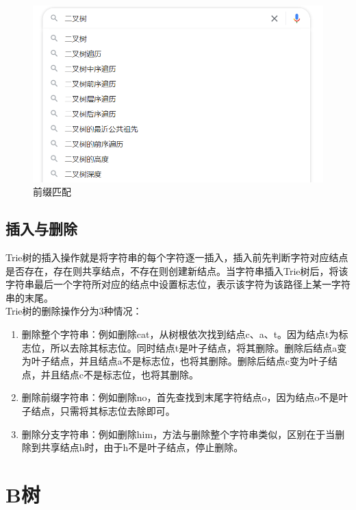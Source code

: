 \begin{figure}[H]
	\centering
	\includegraphics[scale=0.8]{img/C17/17-4/1.png}
	\caption{前缀匹配}
\end{figure}

\vspace{0.5cm}

\subsection{插入与删除}

Trie树的插入操作就是将字符串的每个字符逐一插入，插入前先判断字符对应结点是否存在，存在则共享结点，不存在则创建新结点。当字符串插入Trie树后，将该字符串最后一个字符所对应的结点中设置标志位，表示该字符为该路径上某一字符串的末尾。\\

Trie树的删除操作分为3种情况：

\begin{enumerate}
	\item 删除整个字符串：例如删除cat，从树根依次找到结点c、a、t。因为结点t为标志位，所以去除其标志位。同时结点t是叶子结点，将其删除。删除后结点a变为叶子结点，并且结点a不是标志位，也将其删除。删除后结点c变为叶子结点，并且结点c不是标志位，也将其删除。

	\item 删除前缀字符串：例如删除no，首先查找到末尾字符结点o，因为结点o不是叶子结点，只需将其标志位去除即可。

	\item 删除分支字符串：例如删除him，方法与删除整个字符串类似，区别在于当删除到共享结点h时，由于h不是叶子结点，停止删除。
\end{enumerate}

\newpage

\section{B树}

